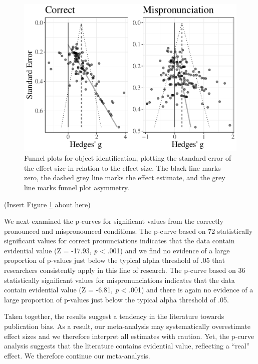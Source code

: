 \documentclass[man]{apa6}
\begin{document}
\begin{figure}
\centering
\includegraphics{VonHolzenBergmann_MPMetaAnalysis_files/figure-latex/FunnelCombo-1.pdf}
\caption{\label{fig:FunnelCombo}Funnel plots for object identification, plotting the standard error of the effect size in relation to the effect size. The black line marks zero, the dashed grey line marks the effect estimate, and the grey line marks funnel plot asymmetry.}
\end{figure}

(Insert Figure \ref{fig:FunnelCombo} about here)

We next examined the p-curves for significant values from the correctly pronounced and mispronounced conditions. The p-curve based on 72 statistically significant values for correct pronunciations indicates that the data contain evidential value (Z = -17.93, \emph{p} \textless{} .001) and we find no evidence of a large proportion of p-values just below the typical alpha threshold of .05 that researchers consistently apply in this line of research. The p-curve based on 36 statistically significant values for mispronunciations indicates that the data contain evidential value (Z = -6.81, \emph{p} \textless{} .001) and there is again no evidence of a large proportion of p-values just below the typical alpha threshold of .05.

Taken together, the results suggest a tendency in the literature towards publication bias. As a result, our meta-analysis may systematically overestimate effect sizes and we therefore interpret all estimates with caution. Yet, the p-curve analysis suggests that the literature contains evidential value, reflecting a \enquote{real} effect. We therefore continue our meta-analysis.
\end{document}
